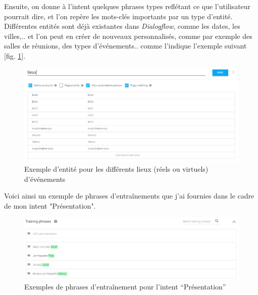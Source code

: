 \documentclass[stage2a]{tnreport} %
\begin{document}
Ensuite, on donne à l'intent quelques phrases types reflétant ce que l'utilisateur pourrait dire, et l'on repère les mots-clés importants par un type d'entité. Différentes entités sont déjà existantes dans \emph{Dialogflow}, comme les dates, les villes,.. et l'on peut en créer de nouveaux personnalisés, comme par exemple des salles de réunions, des types d'événements.. comme l'indique l'exemple suivant [fig. \ref{entity}].\\
\vspace{2\linewidth}
\begin{figure}[h!]
    \centering
    \includegraphics[width=\textwidth]{figures/entity.PNG}
    \caption{Exemple d'entité pour les différents lieux (réels ou virtuels) d'événements}
    \label{entity}
\end{figure}

Voici ainsi un exemple de phrases d'entraînements que j'ai fournies dans le cadre de mon intent "Présentation".\\
\begin{figure}[h!]
    \centering
    \includegraphics[width=\textwidth]{figures/trainingphrases1.PNG}
    \caption{Exemples de phrases d'entraînement pour l'intent ``Présentation''}
    \label{trainingphrases}
\end{figure}
\end{document}
